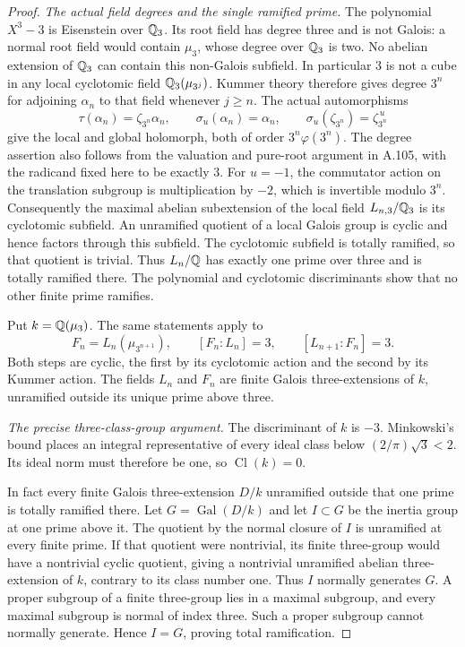 \begin{proof}
\emph{The actual field degrees and the single ramified prime.}
The polynomial \(X^3-3\) is Eisenstein over \(\mathbb Q_3\).
Its root field has degree three and is not Galois:
a normal root field would contain \(\mu_3\), whose
degree over \(\mathbb Q_3\) is two.
No abelian extension of \(\mathbb Q_3\) can contain this
non-Galois subfield.
In particular 3 is not a cube in any local cyclotomic
field \(\mathbb Q_3(\mu_{3^j})\).
Kummer theory therefore gives degree \(3^n\) for
adjoining \(\alpha_n\) to that field whenever \(j\ge n\).
The actual automorphisms
\[
 \tau(\alpha_n)=\zeta_{3^n}\alpha_n,\qquad
 \sigma_u(\alpha_n)=\alpha_n,\qquad
 \sigma_u(\zeta_{3^n})=\zeta_{3^n}^{\,u}
\tag{A.138.6}
\]
give the local and global holomorph, both of order
\(3^n\varphi(3^n)\).
The degree assertion also follows from the valuation
and pure-root argument in A.105, with the radicand
fixed here to be exactly 3.
For \(u=-1\), the commutator action on the
translation subgroup is multiplication by \(-2\),
which is invertible modulo \(3^n\).
Consequently the maximal abelian subextension of
the local field \(L_{n,3}/\mathbb Q_3\) is its cyclotomic
subfield.
An unramified quotient of a local Galois group is
cyclic and hence factors through this subfield.
The cyclotomic subfield is totally ramified, so
that quotient is trivial.
Thus \(L_n/\mathbb Q\) has exactly one prime over three
and is totally ramified there.
The polynomial and cyclotomic discriminants show
that no other finite prime ramifies.

Put \(k=\mathbb Q(\mu_3)\).
The same statements apply to
\[
 F_n=L_n(\mu_{3^{n+1}}),\qquad
 [F_n:L_n]=3,\qquad [L_{n+1}:F_n]=3 .
\tag{A.138.7}
\]
Both steps are cyclic, the first by its cyclotomic
action and the second by its Kummer action.
The fields \(L_n\) and \(F_n\) are finite Galois
three-extensions of \(k\), unramified outside
its unique prime above three.

\emph{The precise three-class-group argument.}
The discriminant of \(k\) is \(-3\).
Minkowski's bound
\cite[Theorem 4.3]{AgentMilneANT}
places an integral representative of every ideal
class below
\((2/\pi)\sqrt3<2\).
Its ideal norm must therefore be one, so
\(\operatorname{Cl}(k)=0\).

In fact every finite Galois three-extension
\(D/k\) unramified outside that one prime is
totally ramified there.
Let \(G=\operatorname{Gal}(D/k)\) and let
\(I\subset G\) be the inertia group at one prime
above it.
The quotient by the normal closure of \(I\)
is unramified at every finite prime.
If that quotient were nontrivial, its finite
three-group would have a nontrivial cyclic
quotient, giving a nontrivial unramified
abelian three-extension of \(k\), contrary
to its class number one.
Thus \(I\) normally generates \(G\).
A proper subgroup of a finite three-group
lies in a maximal subgroup, and every maximal
subgroup is normal of index three.
Such a proper subgroup cannot normally generate.
Hence \(I=G\), proving total ramification.


\end{proof}

